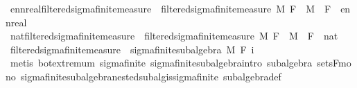 \begin{isabellebody}
\isanewline
{}\isamarkupfalse%
\ ennreal{\isacharunderscore}{\kern0pt}filtered{\isacharunderscore}{\kern0pt}sigma{\isacharunderscore}{\kern0pt}finite{\isacharunderscore}{\kern0pt}measure\ {\isacharequal}{\kern0pt}\ filtered{\isacharunderscore}{\kern0pt}sigma{\isacharunderscore}{\kern0pt}finite{\isacharunderscore}{\kern0pt}measure\ M\ F\ \ M\ \ F\ {\isacharcolon}{\kern0pt}{\isacharcolon}{\kern0pt}\ {\isachardoublequoteopen}ennreal\ {\isasymRightarrow}\ {\isacharunderscore}{\kern0pt}{\isachardoublequoteclose}\isanewline
{}\isamarkupfalse%
\ nat{\isacharunderscore}{\kern0pt}filtered{\isacharunderscore}{\kern0pt}sigma{\isacharunderscore}{\kern0pt}finite{\isacharunderscore}{\kern0pt}measure\ {\isacharequal}{\kern0pt}\ filtered{\isacharunderscore}{\kern0pt}sigma{\isacharunderscore}{\kern0pt}finite{\isacharunderscore}{\kern0pt}measure\ M\ F\ \ M\ \ F\ {\isacharcolon}{\kern0pt}{\isacharcolon}{\kern0pt}\ {\isachardoublequoteopen}nat\ {\isasymRightarrow}\ {\isacharunderscore}{\kern0pt}{\isachardoublequoteclose}\isanewline
\isanewline
{}\isamarkupfalse%
\ filtered{\isacharunderscore}{\kern0pt}sigma{\isacharunderscore}{\kern0pt}finite{\isacharunderscore}{\kern0pt}measure\ {\isasymsubseteq}\ sigma{\isacharunderscore}{\kern0pt}finite{\isacharunderscore}{\kern0pt}subalgebra\ M\ {\isachardoublequoteopen}F\ i{\isachardoublequoteclose}%
\isadelimproof
\ %
\endisadelimproof
%
\isatagproof
{}\isamarkupfalse%
\ {\isacharparenleft}{\kern0pt}metis\ bot{\isachardot}{\kern0pt}extremum\ sigma{\isacharunderscore}{\kern0pt}finite\ sigma{\isacharunderscore}{\kern0pt}finite{\isacharunderscore}{\kern0pt}subalgebra{\isachardot}{\kern0pt}intro\ subalgebra\ sets{\isacharunderscore}{\kern0pt}F{\isacharunderscore}{\kern0pt}mono\ sigma{\isacharunderscore}{\kern0pt}finite{\isacharunderscore}{\kern0pt}subalgebra{\isachardot}{\kern0pt}nested{\isacharunderscore}{\kern0pt}subalg{\isacharunderscore}{\kern0pt}is{\isacharunderscore}{\kern0pt}sigma{\isacharunderscore}{\kern0pt}finite\ subalgebra{\isacharunderscore}{\kern0pt}def{\isacharparenright}{\kern0pt}%
\endisatagproof
{\isafoldproof}%
%
\isadelimproof
%
\endisadelimproof
%
\isadelimdocument
%
\endisadelimdocument
%
\isatagdocument
%
\isamarkuptrue%
%
\endisatagdocument
{\isafolddocument}%
%
\isadelimdocument
%
\endisadelimdocument
{}\isamarkupfalse%

\end{isabellebody}
